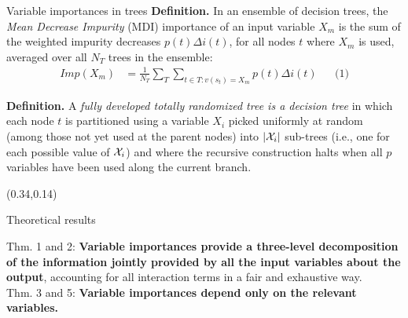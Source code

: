 \documentclass[final]{beamer}
\newcommand{\cmark}{\ding{51}}%
\begin{document}
\begin{frame}{}
\begin{textblock}{0.32}
\begin{block}{Variable importances in trees \phantom{p}}
\textbf{Definition.} In an ensemble of decision trees, the \textit{Mean
Decrease Impurity} (MDI) importance of an input variable $X_m$ is the
sum of the weighted impurity decreases $p(t)\Delta i(t)$, for all nodes $t$
where $X_m$ is used, averaged over all $N_T$ trees in the ensemble:
\begin{align*}\label{eq:mdi}
Imp(X_m) &= \frac{1}{N_T} \sum_{T} \sum_{t \in T:v(s_t) = X_m} p(t) \Delta i(t) &&\text{(1)}
\end{align*}

\vspace{0.3cm}

\textbf{Definition.} A \textit{fully developed  totally randomized tree is a decision tree} in which each node $t$ is
partitioned using a variable $X_i$ picked uniformly at random (among those not
yet used at the parent nodes) into $|{\cal
X}_i|$ sub-trees (i.e., one for each possible value of ${\cal X}_i$) and where
the recursive construction halts when all $p$ variables have been
used along the current branch.

\end{block}

\end{textblock}




\begin{textblock}{0.32}(0.34,0.14)

\begin{block}{Theoretical results \phantom{p}}

{\color{green} \cmark} Thm. 1 and 2: \textbf{Variable importances provide a three-level decomposition
of the information jointly provided by all the input variables about the output}, accounting for all interaction terms in a fair and exhaustive way.\\
{\color{green} \cmark} Thm. 3 and 5: \textbf{Variable importances depend only on the relevant
variables.}


\end{block}
\end{textblock}
\end{frame}
\end{document}

